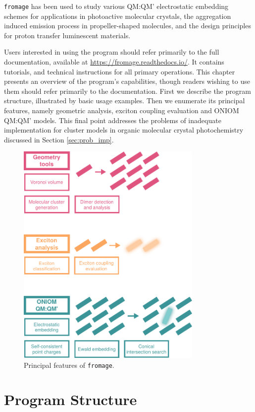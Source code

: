 \texttt{fromage} has been used to study various QM:QM' electrostatic embedding schemes for applications in photoactive molecular crystals,\cite{Rivera2019} the aggregation induced emission process in propeller-shaped molecules,\cite{Stojanovic2019} and the design principles for proton transfer luminescent materials.\cite{Dommett2019} 

Users interested in using the program should refer primarily to the full documentation, available at \href{https://fromage.readthedocs.io/}{https://fromage.readthedocs.io/}. It contains tutorials, and technical instructions for all primary operations. This chapter presents an overview of the program's capabilities, though readers wishing to use them should refer primarily to the documentation. First we describe the program structure, illustrated by basic usage examples. Then we enumerate its principal features, namely geometric analysis, exciton coupling evaluation and ONIOM QM:QM' models. This final point addresses the problems of inadequate implementation for cluster models in organic molecular crystal photochemistry discussed in Section \ref{sec:prob_imp}.

\begin{figure}[ht]
  \includegraphics[width=9cm]{Chapters/6Implementation/scheme.pdf}
  \caption{Principal features of \texttt{fromage}.}
  \label{fig:features}
\end{figure}

\section{Program Structure}
